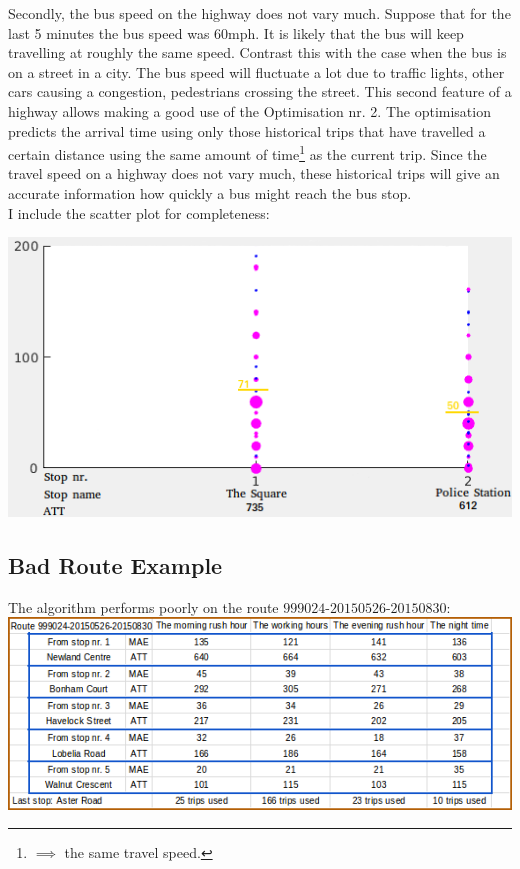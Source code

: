 \documentclass[12pt,a4paper,oneside,openright]{report}
\begin{document}
Secondly, the bus speed on the highway does not vary
much. Suppose that for the last 5 minutes the bus speed was $60$mph. It is 
likely that the bus will keep travelling at roughly the same speed. Contrast this with the
case when the bus is on a street in a city. The bus speed will fluctuate a lot due to
traffic lights, other cars causing a congestion, pedestrians crossing the street.
This second feature of a highway allows making a good use of the
Optimisation nr. 2. The optimisation predicts the arrival time using only those
historical trips that have travelled a certain distance using the same amount of
time\footnote{$\implies$ the same travel speed.} as the current trip. Since the travel
speed on a highway does not vary much, these historical trips will give an accurate
information how quickly a bus might reach the bus stop. \\

I include the scatter plot for completeness:

\includegraphics[scale=0.5]{figs/best_scatter_plot.png}

\subsection*{Bad Route Example}

The algorithm performs poorly on the route $999024$-$20150526$-$20150830$: \\

\includegraphics[width=\textwidth]{figs/table_of_999024.png} \\
\end{document}
